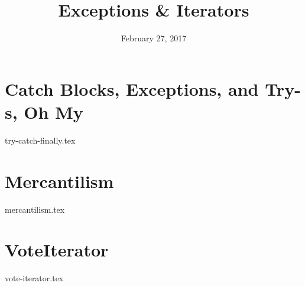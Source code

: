 \documentclass{exam}
\title{Exceptions \& Iterators}
\date{February 27, 2017}
\begin{document}
\maketitle

\section{Catch Blocks, Exceptions, and Try-s, Oh My}
\begin{questions}
{try-catch-finally.tex}
\end{questions}

\clearpage

\section{Mercantilism}
\begin{questions}
{mercantilism.tex}
\end{questions}

\clearpage

\section{VoteIterator}
\begin{questions}
{vote-iterator.tex}
\end{questions}
\end{document}
